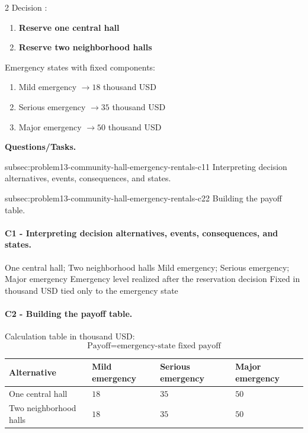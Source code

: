 	\begin{multicols}{2}
		Decision :
		\begin{enumerate}[label=\arabic*.]
			\item \textbf{Reserve one central hall}
			\item \textbf{Reserve two neighborhood halls}
		\end{enumerate}

			\columnbreak

		Emergency states with fixed  components:
		\begin{enumerate}[label=\arabic*.]
			\item Mild emergency $\to 18$ thousand USD
			\item Serious emergency $\to 35$ thousand USD
			\item Major emergency $\to 50$ thousand USD
		\end{enumerate}
	\end{multicols}

	\textbf{Questions/Tasks.}
	\begin{enumerate}
		\CriterionTask
		{subsec:problem13-community-hall-emergency-rentals-c1}{1}
		{Interpreting decision alternatives, events, consequences, and states.}

		\CriterionTask
		{subsec:problem13-community-hall-emergency-rentals-c2}{2}
		{Building the payoff table.}
	\end{enumerate}

	\paragraph*{C1 - Interpreting decision alternatives, events, consequences, and states.}
	\label{subsec:problem13-community-hall-emergency-rentals-c1}
	\DecisionElementsTable
	{One central hall; Two neighborhood halls}
	{Mild emergency; Serious emergency; Major emergency}
	{Emergency level realized after the reservation decision}
	{Fixed  in thousand USD tied only to the emergency state}


	\paragraph*{C2 - Building the payoff table.}
	\label{subsec:problem13-community-hall-emergency-rentals-c2}
	Calculation table in thousand USD:
	\[
	\text{Payoff}=\text{emergency-state fixed payoff}
	\]
	\begin{center}
		\begin{tabular}{llll}
			\toprule
			Alternative & Mild emergency & Serious emergency & Major emergency \\
			\midrule
			One central hall & $18$ & $35$ & $50$ \\
			Two neighborhood halls & $18$ & $35$ & $50$ \\
			\bottomrule
		\end{tabular}
	\end{center}

